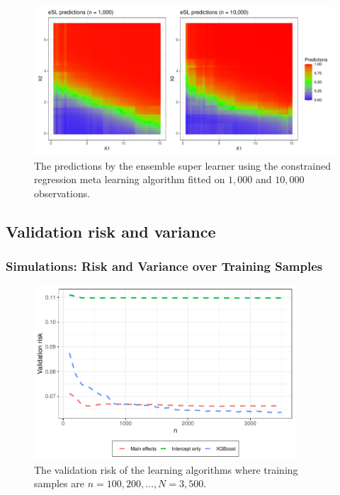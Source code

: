 \documentclass{beamer}
\begin{document}
\begin{frame}
    \begin{figure}[H]
        \centering
        \centerline{\includegraphics[width=1.1\textwidth]{figures/esl_preds_par.pdf}}
        \caption{The predictions by the ensemble super learner using the constrained regression meta learning algorithm fitted on $ 1,000 $ and $ 10,000 $ observations.}
        \label{fig:esl_preds_quad_prog}
    \end{figure}
\end{frame}


\subsection{Validation risk and variance}
\begin{frame}
    \frametitle{Simulations: Risk and Variance over Training Samples} 
    \begin{figure}[H]
        \centering
        \includegraphics[width=0.87\textwidth]{figures/losses_candidates.pdf}
        \caption{The validation risk of the learning algorithms where training samples are $n = 100, 200, \dots , N = 3,500 $.}
        \label{fig:losses_esl_s22}
    \end{figure}
\end{frame}
\end{document}
